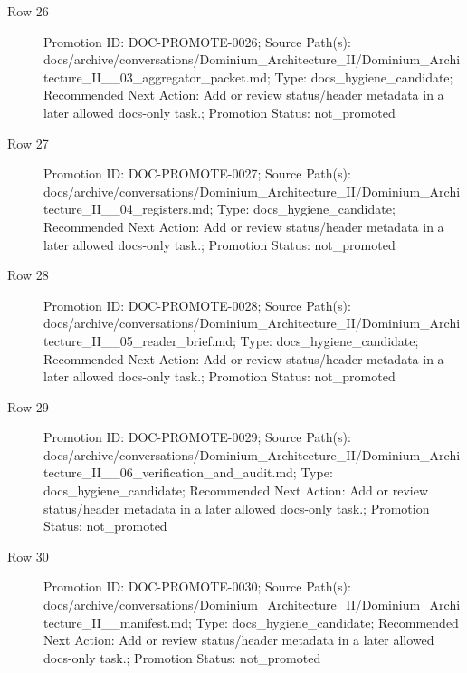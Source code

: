 \documentclass[9pt,a4paper,openany]{book}
\begin{document}
\begin{description}
\item[Row 26] Promotion ID: DOC-\allowbreak{}PROMOTE-\allowbreak{}0026; Source Path(s): docs/\allowbreak{}archive/\allowbreak{}conversations/\allowbreak{}Dominium\_\allowbreak{}Architecture\_\allowbreak{}II/\allowbreak{}Dominium\_\allowbreak{}Architecture\_\allowbreak{}II\_\allowbreak{}\_\allowbreak{}03\_\allowbreak{}aggregator\_\allowbreak{}packet.\allowbreak{}md; Type: docs\_\allowbreak{}hygiene\_\allowbreak{}candidate; Recommended Next Action: Add or review status/\allowbreak{}header metadata in a later allowed docs-\allowbreak{}only task.\allowbreak{}; Promotion Status: not\_\allowbreak{}promoted
\item[Row 27] Promotion ID: DOC-\allowbreak{}PROMOTE-\allowbreak{}0027; Source Path(s): docs/\allowbreak{}archive/\allowbreak{}conversations/\allowbreak{}Dominium\_\allowbreak{}Architecture\_\allowbreak{}II/\allowbreak{}Dominium\_\allowbreak{}Architecture\_\allowbreak{}II\_\allowbreak{}\_\allowbreak{}04\_\allowbreak{}registers.\allowbreak{}md; Type: docs\_\allowbreak{}hygiene\_\allowbreak{}candidate; Recommended Next Action: Add or review status/\allowbreak{}header metadata in a later allowed docs-\allowbreak{}only task.\allowbreak{}; Promotion Status: not\_\allowbreak{}promoted
\item[Row 28] Promotion ID: DOC-\allowbreak{}PROMOTE-\allowbreak{}0028; Source Path(s): docs/\allowbreak{}archive/\allowbreak{}conversations/\allowbreak{}Dominium\_\allowbreak{}Architecture\_\allowbreak{}II/\allowbreak{}Dominium\_\allowbreak{}Architecture\_\allowbreak{}II\_\allowbreak{}\_\allowbreak{}05\_\allowbreak{}reader\_\allowbreak{}brief.\allowbreak{}md; Type: docs\_\allowbreak{}hygiene\_\allowbreak{}candidate; Recommended Next Action: Add or review status/\allowbreak{}header metadata in a later allowed docs-\allowbreak{}only task.\allowbreak{}; Promotion Status: not\_\allowbreak{}promoted
\item[Row 29] Promotion ID: DOC-\allowbreak{}PROMOTE-\allowbreak{}0029; Source Path(s): docs/\allowbreak{}archive/\allowbreak{}conversations/\allowbreak{}Dominium\_\allowbreak{}Architecture\_\allowbreak{}II/\allowbreak{}Dominium\_\allowbreak{}Architecture\_\allowbreak{}II\_\allowbreak{}\_\allowbreak{}06\_\allowbreak{}verification\_\allowbreak{}and\_\allowbreak{}audit.\allowbreak{}md; Type: docs\_\allowbreak{}hygiene\_\allowbreak{}candidate; Recommended Next Action: Add or review status/\allowbreak{}header metadata in a later allowed docs-\allowbreak{}only task.\allowbreak{}; Promotion Status: not\_\allowbreak{}promoted
\item[Row 30] Promotion ID: DOC-\allowbreak{}PROMOTE-\allowbreak{}0030; Source Path(s): docs/\allowbreak{}archive/\allowbreak{}conversations/\allowbreak{}Dominium\_\allowbreak{}Architecture\_\allowbreak{}II/\allowbreak{}Dominium\_\allowbreak{}Architecture\_\allowbreak{}II\_\allowbreak{}\_\allowbreak{}manifest.\allowbreak{}md; Type: docs\_\allowbreak{}hygiene\_\allowbreak{}candidate; Recommended Next Action: Add or review status/\allowbreak{}header metadata in a later allowed docs-\allowbreak{}only task.\allowbreak{}; Promotion Status: not\_\allowbreak{}promoted

\end{description}
\end{document}
